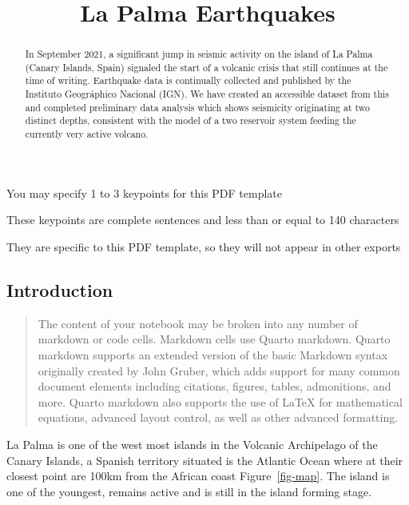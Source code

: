 \documentclass[
]{agujournal2019}
\begin{document}
\title{La Palma Earthquakes}


\begin{keypoints}
\item You may specify 1 to 3 keypoints for this PDF template \item These
keypoints are complete sentences and less than or equal to 140
characters \item They are specific to this PDF template, so they will
not appear in other exports 
\end{keypoints}

\begin{abstract}
In September 2021, a significant jump in seismic activity on the island
of La Palma (Canary Islands, Spain) signaled the start of a volcanic
crisis that still continues at the time of writing. Earthquake data is
continually collected and published by the Instituto Geográphico
Nacional (IGN). We have created an accessible dataset from this and
completed preliminary data analysis which shows seismicity originating
at two distinct depths, consistent with the model of a two reservoir
system feeding the currently very active volcano.
\end{abstract}



\subsection{Introduction}\label{introduction}

\begin{quote}
The content of your notebook may be broken into any number of markdown
or code cells. Markdown cells use Quarto markdown. Quarto markdown
supports an extended version of the basic Markdown syntax originally
created by John Gruber, which adds support for many common document
elements including citations, figures, tables, admonitions, and more.
Quarto markdown also supports the use of LaTeX for mathematical
equations, advanced layout control, as well as other advanced
formatting.
\end{quote}

La Palma is one of the west most islands in the Volcanic Archipelago of
the Canary Islands, a Spanish territory situated is the Atlantic Ocean
where at their closest point are 100km from the African coast
Figure~\ref{fig-map}. The island is one of the youngest, remains active
and is still in the island forming stage.
\end{document}
